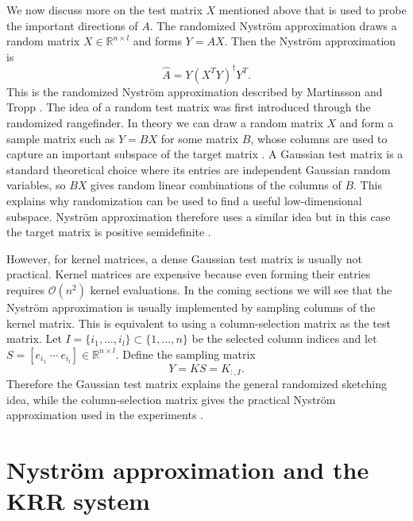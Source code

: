 We now discuss more on the test matrix $X$ mentioned above that is used to probe the important directions of $A$. The randomized Nystr\"om approximation draws a random matrix
$X\in\mathbb{R}^{n\times l}$ and forms $Y=AX.$ Then the Nystr\"om approximation is
\[
\hat A=Y(X^TY)^\dagger Y^T.
\]
This is the randomized Nystr\"om approximation described by Martinsson and Tropp \citep{martinsson2020randomized}. The idea of a random test matrix was first introduced through the randomized rangefinder. In theory we can draw a random matrix $X$ and form a sample matrix such as $Y=BX$ for some matrix $B$, whose columns are used to capture an important subspace of the target matrix \citep{troppfinding,martinsson2020randomized}. A Gaussian test matrix is a standard theoretical choice where its entries are independent Gaussian random variables, so $BX$ gives random linear combinations of the columns of $B$. This explains why randomization can be used to find a useful low-dimensional subspace. Nystr\"om approximation therefore uses a similar idea but in this case the target matrix is positive semidefinite \citep[Section 14]{martinsson2020randomized}.

However, for kernel matrices, a dense Gaussian test matrix is usually not practical. Kernel matrices are expensive because even forming their entries requires $\mathcal{O}(n^2)$ kernel evaluations. In the coming sections we will see that the Nystr\"om approximation is usually implemented by sampling columns of the kernel matrix. This is equivalent to using a column-selection matrix as the test matrix. Let $I=\{i_1,\ldots,i_l\}\subset\{1,\ldots,n\}$ be the selected column indices and let $S=[e_{i_1}\ \cdots\ e_{i_l}]\in\mathbb R^{n\times l}$. Define the sampling matrix
\[
Y=KS=K_{:,I}.
\]
Therefore the Gaussian test matrix explains the general randomized sketching idea, while the column-selection matrix gives the practical Nystr\"om approximation used in the experiments \citep{williams2000using,kumar2012sampling,gittens2016revisiting}.

\section{Nystr\"om approximation and the KRR system}

